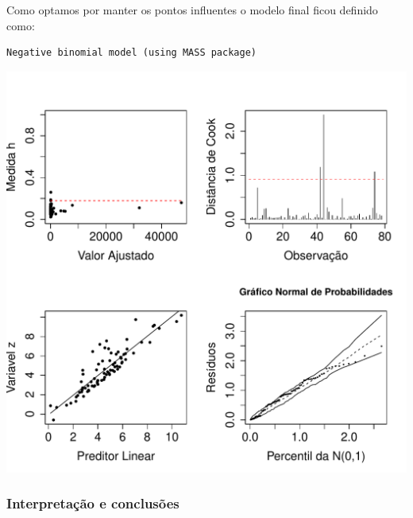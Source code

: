 \documentclass[12pt,a4paper]{article}\usepackage[]{graphicx}\usepackage[]{color}
\makeatletter
\def\maxwidth{ %
  \ifdim\Gin@nat@width>\linewidth
    \linewidth
  \else
    \Gin@nat@width
  \fi
}
\newenvironment{kframe}{%
 \def\at@end@of@kframe{}%
 \ifinner\ifhmode%
  \def\at@end@of@kframe{\end{minipage}}%
  \begin{minipage}{\columnwidth}%
 \fi\fi%
 \def\FrameCommand##1{\hskip\@totalleftmargin \hskip-\fboxsep
 \colorbox{shadecolor}{##1}\hskip-\fboxsep
     \hskip-\linewidth \hskip-\@totalleftmargin \hskip\columnwidth}%
 \MakeFramed {\advance\hsize-\width
   \@totalleftmargin\z@ \linewidth\hsize
   \@setminipage}}%
 {\par\unskip\endMakeFramed%
 \at@end@of@kframe}
\newenvironment{knitrout}{}{} %
\makeatother
\begin{document}
Como optamos por manter os pontos influentes o modelo final ficou definido como:


\begin{knitrout}
\color{fgcolor}\begin{kframe}
\begin{verbatim}
Negative binomial model (using MASS package) 
\end{verbatim}
\end{kframe}
\includegraphics[width=\maxwidth]{figure/unnamed-chunk-30-1} 

\end{knitrout}
\subsubsection{\textbf{Interpretação e conclusões}}
\end{document}
